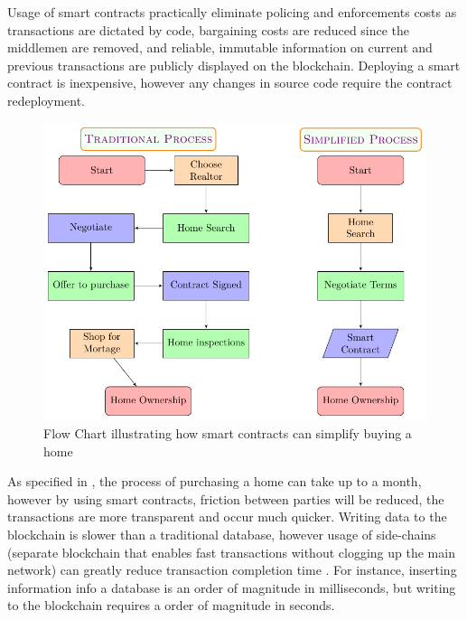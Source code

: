 \documentclass[12pt]{scrreprt}
\begin{document}
 Usage of smart contracts practically eliminate policing and enforcements costs as transactions are dictated by code, bargaining costs are reduced since the middlemen are removed, and reliable, immutable information on current and previous transactions are publicly displayed on the blockchain. Deploying a smart contract is inexpensive, however any changes in source code require the contract redeployment.
 
 \begin{figure}[ht]
   	\centering 
   	\includegraphics[width=0.7\linewidth]{ms-II/simplifyingPurchasingAHome.pdf}
   	\caption{Flow Chart illustrating how smart contracts can simplify buying a home}
   	\label{smartContract}
   	\end{figure}
   	
As specified in \cite{buyingHome:Online}, the process of purchasing a home can take up to a month, however by using smart contracts, friction between parties will be reduced, the transactions are more transparent and occur much quicker.  Writing data to the blockchain is slower than a traditional database, however usage of side-chains (separate blockchain that enables fast transactions without clogging up the main network) can greatly reduce transaction completion time \cite{sideChains:Online}. For instance, inserting information info a database is an order of magnitude in milliseconds, but writing to the blockchain requires a order of magnitude in seconds. 

\end{document}
